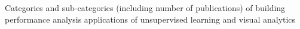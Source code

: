 Categories and sub-categories (including number of publications) of building performance analysis applications of unsupervised learning and visual analytics
\label{fig:categoriespie}